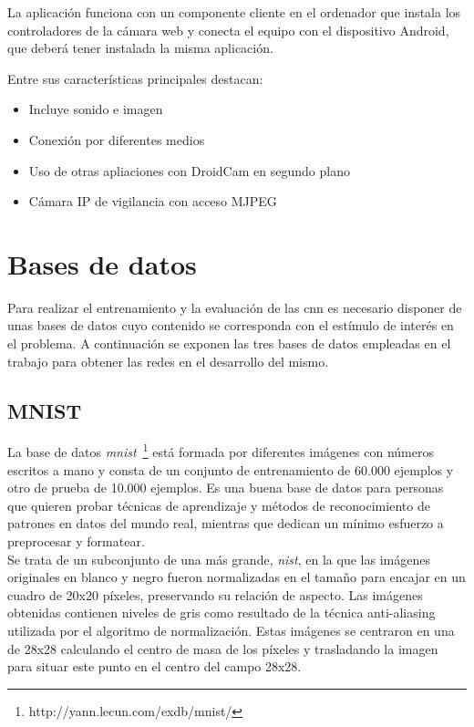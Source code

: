 La aplicación funciona con un componente cliente en el ordenador que instala los controladores de la cámara web y conecta el equipo con el dispositivo Android, que deberá tener instalada la misma aplicación.\\
\vspace{20pt}

Entre sus características principales destacan:
	\begin{itemize}
		\item Incluye sonido e imagen
		\item Conexión por diferentes medios
		\item Uso de otras apliaciones con DroidCam en segundo plano
		\item Cámara IP de vigilancia con acceso MJPEG
	\end{itemize}

\section{Bases de datos}
Para realizar el entrenamiento y la evaluación de las \acrshort{cnn} es necesario disponer de unas bases de datos cuyo contenido se corresponda con el estímulo de interés en el problema. A continuación se exponen las tres bases de datos empleadas en el trabajo para obtener las redes en el desarrollo del mismo.

\subsection{MNIST}\label{sec.minst}
La base de datos \textit{\acrfull{mnist}}~\footnote{http://yann.lecun.com/exdb/mnist/} está formada por diferentes imágenes con números escritos a mano y consta de un conjunto de entrenamiento de 60.000 ejemplos y otro de prueba de 10.000 ejemplos. Es una buena base de datos para personas que quieren probar técnicas de aprendizaje y métodos de reconocimiento de patrones en datos del mundo real, mientras que dedican un mínimo esfuerzo a preprocesar y formatear. \\

Se trata de un subconjunto de una más grande, \textit{\acrfull{nist}}, en la que las imágenes originales en blanco y negro fueron normalizadas en el tamaño para encajar en un cuadro de 20x20 píxeles, preservando su relación de aspecto. Las imágenes obtenidas contienen niveles de gris como resultado de la técnica anti-aliasing utilizada por el algoritmo de normalización. Estas imágenes se centraron en una de 28x28 calculando el centro de masa de los píxeles y trasladando la imagen para situar este punto en el centro del campo 28x28.\\


